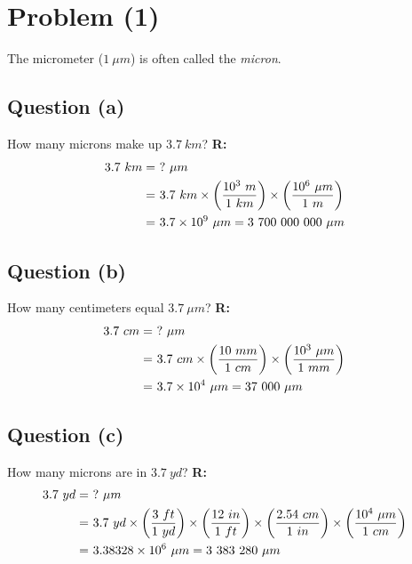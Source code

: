 \section{Problem (1)}
	The micrometer ($1 \ \mu m$) is often called the \emph{micron}.

	\subsection{Question (a)}
		How many microns make up $3.7 \ km$? \newline
		\textbf{R:}
		\begin{align}
			3.7 \ km = \ & ? \ \mu m & \notag \\
			= \ & 3.7 \ km
			\times \left( \frac{10^{3} \ m}{1 \ km} \right)
			\times \left( \frac{10^{6} \ \mu m}{1 \ m} \right)& \notag \\
			= \ & 3.7 \times 10^{9} \ \mu m  = 3 \ 700 \ 000 \ 000 \ \mu m&
		\end{align}

	\subsection{Question (b)}
		How many centimeters equal $3.7 \ \mu m$? \newline
		\textbf{R:}
		\begin{align}
			3.7 \ cm = \ & ? \ \mu m & \notag \\
			= \ & 3.7 \ cm
			\times \left( \frac{10 \ mm}{1 \ cm} \right)
			\times \left( \frac{10^{3} \ \mu m}{1 \ mm} \right)& \notag \\
			= \ & 3.7 \times 10^{4} \ \mu m  = 37 \ 000 \ \mu m&
		\end{align}

	\subsection{Question (c)}
		How many microns are in $3.7 \ yd$? \newline
		\textbf{R:}
		\begin{align}
			3.7 \ yd = \ & ? \ \mu m & \notag \\
			= \ & 3.7 \ yd
			\times \left( \frac{3 \ ft}{1 \ yd} \right)
			\times \left( \frac{12 \ in}{1 \ ft} \right)
			\times \left( \frac{2.54 \ cm}{1 \ in} \right)
			\times \left( \frac{10^{4} \ \mu m}{1 \ cm} \right)& \notag \\
			= \ & 3.38328 \times 10^{6} \ \mu m  = 3 \ 383 \ 280 \ \mu m&
		\end{align}
